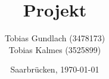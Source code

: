 \begin{titlepage}

	\titlehead
	{
		\texttt{[image: images/logos/HTW]}		
		\hfill
		\texttt{[image: images/logos/android]}		
	}
	
	\subject
	{
		\Huge Dokumentation\\
		\normalsize Mobile Computing\\
	}
	
	\title
	{
		Projekt
	}
	
	\author
	{	
		Tobias Gundlach (3478173)\\
		Tobias Kalmes (3525899)
	}
	
	\date
	{
		\normalsize{Saarbrücken, \today}
	}	
	\maketitle	
\end{titlepage}
